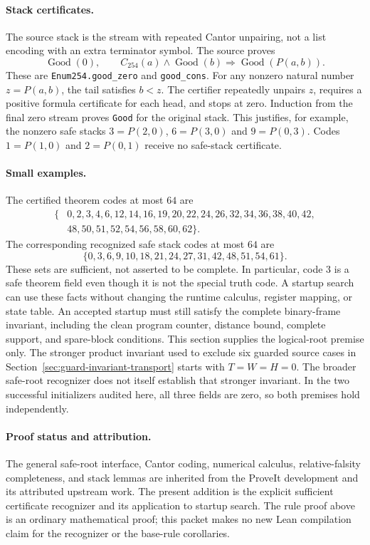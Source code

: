 \paragraph{Stack certificates.}
The source stack is the stream with repeated Cantor unpairing, not a
list encoding with an extra terminator symbol.  The source proves
\[
 \operatorname{Good}(0),\qquad
 C_{254}(a)\wedge\operatorname{Good}(b)
 \Longrightarrow\operatorname{Good}(P(a,b)).
\]
These are \texttt{Enum254.good\_zero} and \texttt{good\_cons}.
For any nonzero natural number $z=P(a,b)$, the tail satisfies $b<z$.
The certifier repeatedly unpairs $z$, requires a positive formula
certificate for each head, and stops at zero.  Induction from the final
zero stream proves \texttt{Good} for the original stack.  This justifies,
for example, the nonzero safe stacks $3=P(2,0)$, $6=P(3,0)$ and
$9=P(0,3)$.  Codes $1=P(1,0)$ and $2=P(0,1)$ receive no safe-stack
certificate.

\paragraph{Small examples.}
The certified theorem codes at most $64$ are
\[
\begin{split}
\{&0,2,3,4,6,12,14,16,19,20,22,24,26,32,34,36,38,40,42,\\
  &48,50,51,52,54,56,58,60,62\}.
\end{split}
\]
The corresponding recognized safe stack codes at most $64$ are
\[
\{0,3,6,9,10,18,21,24,27,31,42,48,51,54,61\}.
\]
These sets are sufficient, not asserted to be complete.  In particular,
code $3$ is a safe theorem field even though it is not the special truth
code.  A startup search can use these facts without changing the runtime
calculus, register mapping, or state table.  An accepted startup must
still satisfy the complete binary-frame invariant, including the clean
program counter, distance bound, complete support, and spare-block
conditions.  This section supplies the logical-root premise only.
The stronger product invariant used to exclude six guarded source cases
in Section~\ref{sec:guard-invariant-transport} starts with $T=W=H=0$.
The broader safe-root recognizer does not itself establish that stronger
invariant.  In the two successful initializers audited here, all three
fields are zero, so both premises hold independently.

\paragraph{Proof status and attribution.}
The general safe-root interface, Cantor coding, numerical calculus,
relative-falsity completeness, and stack lemmas are inherited from the
ProveIt development and its attributed upstream work.  The present
addition is the explicit sufficient certificate recognizer and its
application to startup search.  The rule proof above is an ordinary
mathematical proof; this packet makes no new Lean compilation claim for
the recognizer or the base-rule corollaries.
